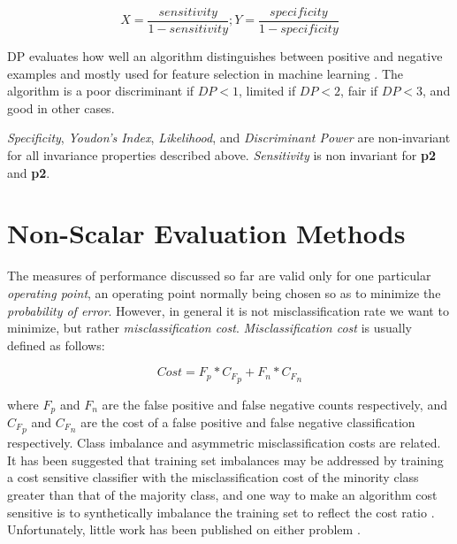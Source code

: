 \documentclass[10pt]{unbthesis}
\begin{document}
\begin{itemize}
        \begin{equation}
          \label{equ:xy}
          X = \frac{sensitivity}{1 - sensitivity}; Y =
          \frac{specificity}{1 - specificity}
        \end{equation}
        
        DP evaluates how well an algorithm distinguishes between
        positive and negative examples and mostly used for feature
        selection in machine learning \cite{RefWorks:37}. The
        algorithm is a poor discriminant if \(DP < 1\), limited if
        \(DP < 2\), fair if \(DP < 3\), and good in other
        cases.

\end{itemize}

\textit{Specificity}, \textit{Youdon's Index}, \textit{Likelihood},
and \textit{Discriminant Power} are non-invariant for all invariance
properties described above. \textit{Sensitivity} is non invariant for
\textbf{p2} and \textbf{p2}.

\section{Non-Scalar Evaluation Methods}
The measures of performance discussed so far are valid only for one
particular \textit{operating point}, an operating point normally being
chosen so as to minimize the \textit{probability of error}. However,
in general it is not misclassification rate we want to minimize, but
rather \textit{misclassification cost}. \textit{Misclassification
  cost} is usually defined as follows:

\begin{equation}
\label{equ:misclasscost}
Cost = F_p * {C_F}_p + F_n * {C_F}_n
\end{equation}

where \(F_p\) and \(F_n\) are the false positive and false negative
counts respectively, and \({C_F}_p\) and \({C_F}_n\) are the cost of a
false positive and false negative classification respectively. Class
imbalance and asymmetric misclassification costs are related. It has
been suggested that training set imbalances may be addressed by
training a cost sensitive classifier with the misclassification cost
of the minority class greater than that of the majority class, and one
way to make an algorithm cost sensitive is to synthetically imbalance
the training set to reflect the cost ratio
\cite{RefWorks:52}. Unfortunately, little work has been published on
either problem \cite{RefWorks:61}.
\end{document}
